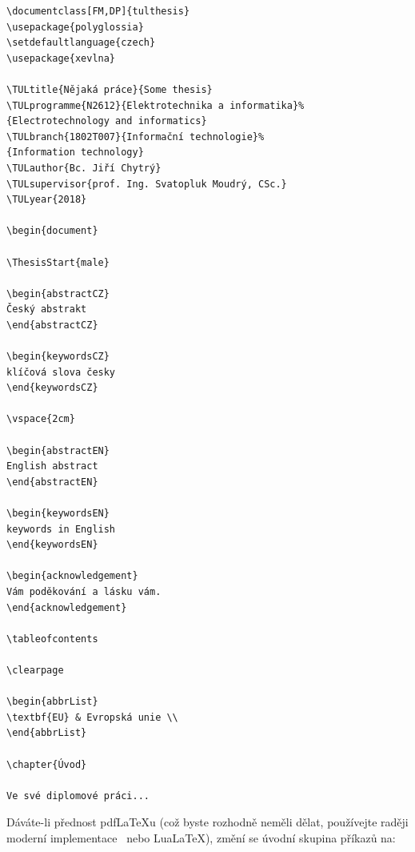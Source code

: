 \documentclass[FM,BP]{tulthesis}
\newenvironment{myquote}{\begin{list}{}{\setlength\leftmargin\parindent}\item[]}{\end{list}}
\newenvironment{listing}{\begin{myquote}\color{\tulcolor}}{\end{myquote}}
\begin{document}
\begin{listing}
\begin{verbatim}
\documentclass[FM,DP]{tulthesis}
\usepackage{polyglossia}
\setdefaultlanguage{czech}
\usepackage{xevlna}

\TULtitle{Nějaká práce}{Some thesis}
\TULprogramme{N2612}{Elektrotechnika a informatika}%
{Electrotechnology and informatics}
\TULbranch{1802T007}{Informační technologie}%
{Information technology}
\TULauthor{Bc. Jiří Chytrý}
\TULsupervisor{prof. Ing. Svatopluk Moudrý, CSc.}
\TULyear{2018}

\begin{document}

\ThesisStart{male}

\begin{abstractCZ}
Český abstrakt
\end{abstractCZ}

\begin{keywordsCZ}
klíčová slova česky
\end{keywordsCZ}

\vspace{2cm}

\begin{abstractEN}
English abstract
\end{abstractEN}

\begin{keywordsEN}
keywords in English
\end{keywordsEN}

\begin{acknowledgement}
Vám poděkování a lásku vám.
\end{acknowledgement}

\tableofcontents

\clearpage

\begin{abbrList}
\textbf{EU} & Evropská unie \\
\end{abbrList}

\chapter{Úvod}

Ve své diplomové práci...
\end{verbatim}
\end{listing}

Dáváte-li přednost pdf\LaTeX u (což byste rozhodně neměli dělat, používejte raději
moderní implementace \XeLaTeX\ nebo Lua\LaTeX), změní se úvodní skupina příkazů na:
\end{document}
